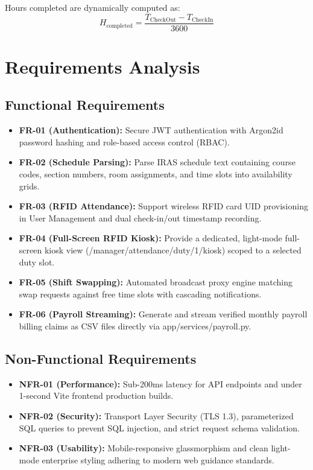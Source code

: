 \documentclass[10pt,a4paper,twocolumn,fleqn]{article}
\newcommand{\myurl}[1]{{\small #1}}
\begin{document}
Hours completed are dynamically computed as:
\begin{equation}
H_{\text{completed}} = \frac{T_{\text{CheckOut}} - T_{\text{CheckIn}}}{3600}
\end{equation}

\section{Requirements Analysis}

\subsection{Functional Requirements}
\begin{itemize}
    \item \textbf{FR-01 (Authentication):} Secure JWT authentication with Argon2id password hashing and role-based access control (RBAC).
    \item \textbf{FR-02 (Schedule Parsing):} Parse IRAS schedule text containing course codes, section numbers, room assignments, and time slots into availability grids.
    \item \textbf{FR-03 (RFID Attendance):} Support wireless RFID card UID provisioning in User Management and dual check-in/out timestamp recording.
    \item \textbf{FR-04 (Full-Screen RFID Kiosk):} Provide a dedicated, light-mode full-screen kiosk view (\myurl{/manager/attendance/duty/1/kiosk}) scoped to a selected duty slot.
    \item \textbf{FR-05 (Shift Swapping):} Automated broadcast proxy engine matching swap requests against free time slots with cascading notifications.
    \item \textbf{FR-06 (Payroll Streaming):} Generate and stream verified monthly payroll billing claims as CSV files directly via app/services/payroll.py.
\end{itemize}

\subsection{Non-Functional Requirements}
\begin{itemize}
    \item \textbf{NFR-01 (Performance):} Sub-200ms latency for API endpoints and under 1-second Vite frontend production builds.
    \item \textbf{NFR-02 (Security):} Transport Layer Security (TLS 1.3), parameterized SQL queries to prevent SQL injection, and strict request schema validation.
    \item \textbf{NFR-03 (Usability):} Mobile-responsive glassmorphism and clean light-mode enterprise styling adhering to modern web guidance standards.
\end{itemize}
\end{document}
